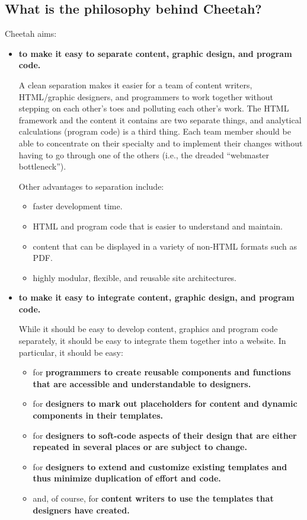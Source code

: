 \subsection{What is the philosophy behind Cheetah?}
\label{intro.aims}
Cheetah aims:
\begin{itemize}
\item {\bf to make it easy to separate content, graphic design, and program code.}
     
     A clean separation makes it easier for a team of content writers,
     HTML/graphic designers, and programmers to work together without stepping
     on each other's toes and polluting each other's work.  The HTML framework
     and the content it contains are two separate things, and analytical
     calculations (program code) is a third thing.  Each team member should be
     able to concentrate on their specialty and to implement their changes
     without having to go through one of the others (i.e., the dreaded
     ``webmaster bottleneck'').

     Other advantages to separation include:
     \begin{itemize}
     \item faster development time.
     \item HTML and program code that is easier to understand and maintain.
     \item content that can be displayed in a variety of non-HTML formats such
          as PDF.
     \item highly modular, flexible, and reusable site architectures.       
     \end{itemize}
     
\item {\bf to make it easy to integrate content, graphic design, and program code.}
     
     While it should be easy to develop content, graphics and program
     code separately, it should be easy to integrate them together into a 
     website.  In particular, it should be easy:

     \begin{itemize}
     \item for \bf{programmers} to create reusable components and functions
          that are accessible and understandable to designers.
     \item for \bf{designers} to mark out placeholders for content and 
          dynamic components in their templates.
     \item for \bf{designers} to soft-code aspects of their design that are
          either repeated in several places or are subject to change.
     \item for \bf{designers} to extend and customize existing templates and
          thus minimize duplication of effort and code.
     \item and, of course, for \bf{content writers} to use the templates that
          designers have created.
     \end{itemize}


\end{itemize}
